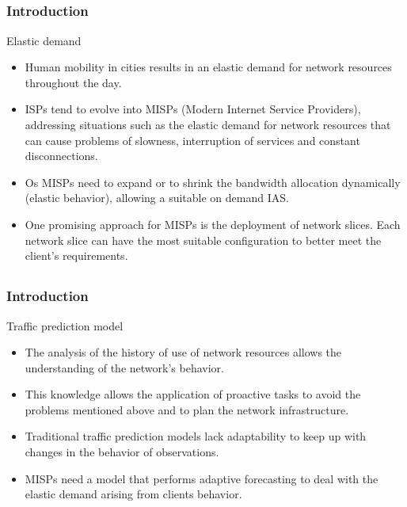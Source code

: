 \documentclass[aspectratio=169]{beamer}
\begin{document}

\subsection{}
\begin{frame}
\frametitle{Introduction}
\begin{block}{Elastic demand}
    \begin{itemize}
        \item Human mobility in cities results in an elastic demand for network resources throughout the day.
        \item ISPs tend to evolve into MISPs (Modern Internet Service Providers), addressing situations such as the elastic demand for network resources that can cause problems of slowness, interruption of services and constant disconnections.
        \item Os MISPs need to expand or to shrink the bandwidth allocation dynamically (elastic behavior), allowing a suitable on demand IAS.
        \item One promising approach for MISPs is the deployment of network slices. Each network slice can have the most suitable configuration to better meet the client’s requirements.
    \end{itemize}
\end{block}
\end{frame}


\subsection{}
\begin{frame}
\frametitle{Introduction}
\begin{block}{Traffic prediction model}
    \begin{itemize}
        \item The analysis of the history of use of network resources allows the understanding of the network's behavior.
        \item This knowledge allows the application of proactive tasks to avoid the problems mentioned above and to plan the network infrastructure.
        \item Traditional traffic prediction models lack adaptability to keep up with changes in the behavior of observations.
        \item MISPs need a model that performs adaptive forecasting to deal with the elastic demand arising from clients behavior.
    \end{itemize}
\end{block}
\end{frame}
\end{document}
